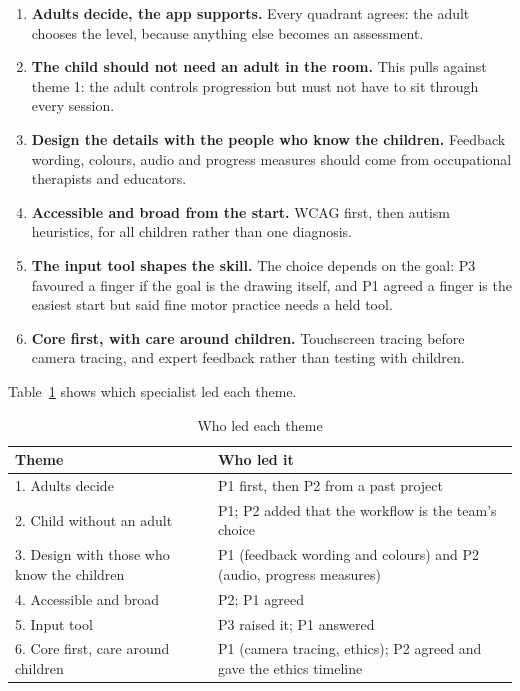 \documentclass{article}
\begin{document}
\begin{enumerate}
\item \textbf{Adults decide, the app supports.} Every quadrant agrees: the
  adult chooses the level, because anything else becomes an assessment.
\item \textbf{The child should not need an adult in the room.} This pulls
  against theme 1: the adult controls progression but must not have to sit
  through every session.
\item \textbf{Design the details with the people who know the children.}
  Feedback wording, colours, audio and progress measures should come from
  occupational therapists and educators.
\item \textbf{Accessible and broad from the start.} WCAG first, then autism
  heuristics, for all children rather than one diagnosis.
\item \textbf{The input tool shapes the skill.} The choice depends on the
  goal: P3 favoured a finger if the goal is the drawing itself, and P1 agreed a
  finger is the easiest start but said fine motor practice needs a held tool.
\item \textbf{Core first, with care around children.} Touchscreen tracing
  before camera tracing, and expert feedback rather than testing with
  children.
\end{enumerate}

Table~\ref{tbl:leads} shows which specialist led each theme.

\begin{table}[h]
\centering
\begin{tabularx}{\textwidth}{lX}
\toprule
\textbf{Theme} & \textbf{Who led it} \\
\midrule
1. Adults decide & P1 first, then P2 from a past project \\
2. Child without an adult & P1; P2 added that the workflow is the team's choice \\
3. Design with those who know the children & P1 (feedback wording and colours) and P2 (audio, progress measures) \\
4. Accessible and broad & P2; P1 agreed \\
5. Input tool & P3 raised it; P1 answered \\
6. Core first, care around children & P1 (camera tracing, ethics); P2 agreed and gave the ethics timeline \\
\bottomrule
\end{tabularx}
\caption{Who led each theme}
\label{tbl:leads}
\end{table}
\end{document}
